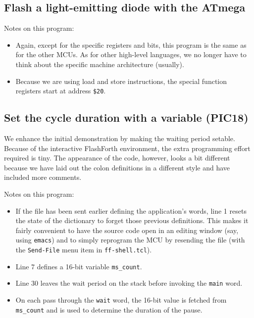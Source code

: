 \documentclass[12pt,a4paper]{article}
\newcommand{\code}[2]{
 \hrulefill
 \scriptsize
 
 \hrulefill
 \vspace{2em}
 \normalsize
}
\begin{document}
\bigskip
\subsection{Flash a light-emitting diode with the ATmega}
%

\noindent
\code{}{../avr8/flash-led-avr.txt}

\medskip\noindent
Notes on this program:
\begin{itemize}
\item Again, except for the specific registers and bits, 
  this program is the same as for the other MCUs.
  As for other high-level languages, we no longer have to think
  about the specific machine architecture (usually).
\item Because we are using load and store instructions, 
  the special function registers start at address \verb!$20!.
\end{itemize}


\newpage
\subsection{Set the cycle duration with a variable (PIC18)}
%
We enhance the initial demonstration by making the waiting period setable.
Because of the interactive FlashForth environment, 
the extra programming effort required is tiny.
The appearance of the code, however, looks a bit different because we have 
laid out the colon definitions in a different style and have included 
more comments.

\bigskip\noindent
\code{}{../pic18/flash-led-var.txt}

\noindent
Notes on this program:
\begin{itemize}
 \item If the file has been sent earlier defining the application's words,
  line 1 resets the state of the dictionary to forget those previous definitions. 
  This makes it fairly convenient to have the source code open in an editing window
  (say, using \verb!emacs!) and to simply reprogram the MCU by resending the file
  (with the \verb!Send-File! menu item in \verb!ff-shell.tcl!). 
 \item Line 7 defines a 16-bit variable \verb!ms_count!.
 \item Line 30 leaves the wait period on the stack before invoking the \verb!main! word.
 \item On each pass through the \verb!wait! word, the 16-bit value is fetched from
  \verb!ms_count! and is used to determine the duration of the pause.
\end{itemize}
\end{document}
